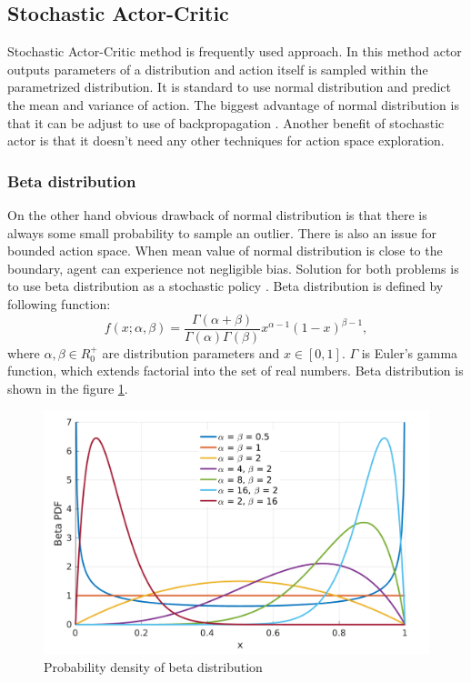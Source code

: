 \subsection{Stochastic Actor-Critic}
Stochastic Actor-Critic method is frequently used approach. In this method actor outputs parameters of a distribution and action itself is sampled within the parametrized distribution. It is standard to use normal distribution and predict the mean and variance of action. The biggest advantage of normal distribution is that it can be adjust to use of backpropagation \cite{hess2015}. Another benefit of stochastic actor is that it doesn't need any other techniques for action space exploration.

\subsubsection{Beta distribution}
On the other hand obvious drawback of normal distribution is that there is always some small probability to sample an outlier. There is also an issue for bounded action space. When mean value of normal distribution is close to the boundary, agent can experience not negligible bias. Solution for both problems is to use beta distribution as a stochastic policy \cite{chou17}. Beta distribution is defined by following function:
\begin{equation}
f(x;\alpha, \beta) = \frac{\Gamma(\alpha + \beta)}{\Gamma(\alpha)\Gamma(\beta)}x^{\alpha-1}(1-x)^{\beta-1},
\end{equation}
where $\alpha,\beta \in R^+_0$ are distribution parameters and $x \in [0, 1]$. $\Gamma$ is Euler's gamma function, which extends factorial into the set of real numbers. Beta distribution is shown in the figure \ref{fig:beta}.

\begin{figure}[H]
\centering
\includegraphics[scale=0.2]{fig/beta.png}
\caption{Probability density of beta distribution}
\label{fig:beta}
\end{figure}

